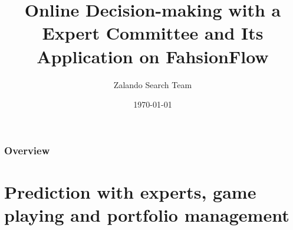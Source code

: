 \documentclass{beamer}
\title[Online Decision-making]{Online Decision-making with a Expert Committee and Its Application on FahsionFlow} %
\author{Zalando Search Team} %
\institute[Zalando SE] %
{
Zalando SE \\ %
\medskip
\textit{hanchen.xiong@zalando.de} %
}
\date{\today} %
\begin{document}
\begin{frame}
\titlepage %
\end{frame}

\begin{frame}
\frametitle{Overview} %
\tableofcontents %
\end{frame}


\section{Prediction with experts, game playing and portfolio management}        %
\end{document}
